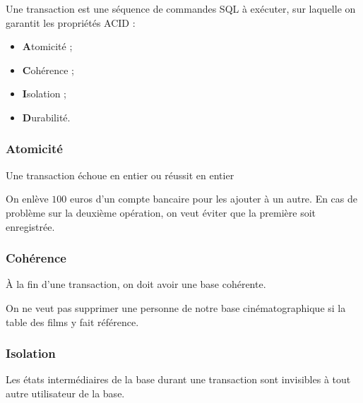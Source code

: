  \begin{defi}[Transaction]
   Une transaction est une séquence de commandes SQL à exécuter, sur laquelle on garantit les propriétés  ACID :
\begin{itemize}
\item \textbf{A}tomicité ;
\item \textbf{C}ohérence ;
\item \textbf{I}solation ;
\item \textbf{D}urabilité.
\end{itemize}
 \end{defi}


\subsubsection{Atomicité}
\begin{defi}[Atomicité]
  Une transaction échoue en entier ou réussit en entier
\end{defi}

\begin{exemple}
  On enlève $100$ euros d'un compte bancaire pour les ajouter à
un autre. En cas de problème sur la deuxième opération, on veut
éviter que la première soit enregistrée.
\end{exemple}

\subsubsection{Cohérence}

\begin{defi}[Cohérence]
  À la fin d'une transaction, on doit avoir une base
cohérente.
\end{defi}

\begin{exemple}
  On ne veut pas supprimer une personne de notre base
cinématographique si la table des films y fait référence.
\end{exemple}


\subsubsection{Isolation}
\begin{defi}[Isolation]
  Les états intermédiaires de la base durant une
transaction sont invisibles à tout autre utilisateur de la base.
\end{defi}



